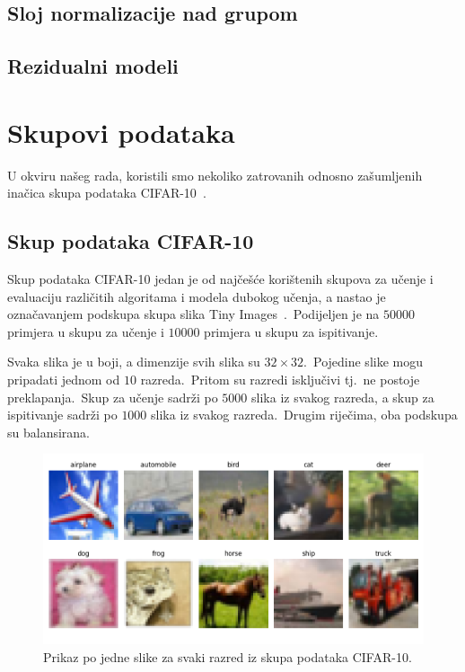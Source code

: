 \documentclass[diplomskirad]{fer}
\begin{document}
\section{Sloj normalizacije nad grupom}
\label{sek:batch_norm}

\section{Rezidualni modeli}
\label{sek:batch_norm}

\chapter{Skupovi podataka}
\label{pog:skup}

U okviru našeg rada, koristili smo nekoliko zatrovanih odnosno zašumljenih inačica skupa podataka CIFAR-10~\cite{krizhevsky2009learning}.\

\section{Skup podataka CIFAR-10}
\label{sek:cifar10}

Skup podataka CIFAR-10 jedan je od najčešće korištenih skupova za učenje i evaluaciju različitih algoritama i modela dubokog učenja, a nastao je označavanjem podskupa skupa slika Tiny Images~\cite{krizhevsky2009learning}.\
Podijeljen je na $50 000$ primjera u skupu za učenje i $10 000$ primjera u skupu za ispitivanje.\ 
  
Svaka slika je u boji, a dimenzije svih slika su $32 \times 32$.\ Pojedine slike mogu pripadati jednom od $10$ razreda.\ Pritom su razredi isključivi tj.\ ne postoje preklapanja.\ 
Skup za učenje sadrži po $5000$ slika iz svakog razreda, a skup za ispitivanje sadrži po $1000$ slika iz svakog razreda.\ Drugim riječima, oba podskupa su balansirana.\ 

\begin{figure}[h]
  \centering
  \includegraphics[scale=0.6]{./Slike/cifar10.png}
  \caption{Prikaz po jedne slike za svaki razred iz skupa podataka CIFAR-10.}
  \label{fig:cifar10}
\end{figure}
\end{document}
